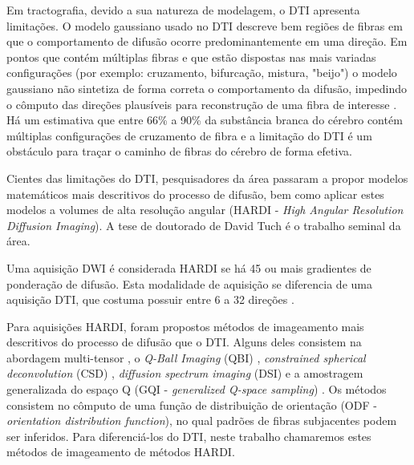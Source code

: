\documentclass[
    12pt,                %
    oneside,            %
    a4paper,            %
    english,            %
    french,                %
    spanish,            %
    brazil                %
    ]{abntex2}
\begin{document}

Em tractografia, devido a sua natureza de modelagem, o DTI apresenta limitações. O modelo gaussiano usado no DTI descreve bem regiões de fibras em que o comportamento de difusão ocorre predominantemente em uma direção. Em pontos que contém múltiplas fibras e que estão dispostas nas mais variadas configurações (por exemplo: cruzamento, bifurcação, mistura, "beijo") o modelo gaussiano não sintetiza de forma correta o comportamento da difusão, impedindo o cômputo das direções plausíveis para reconstrução de uma fibra de interesse \cite{fillard2011, daducci2014}. Há um estimativa que entre 66\% a 90\% da substância branca do cérebro contém múltiplas configurações de cruzamento de fibra \cite{descoteaux2015} e a limitação do DTI é um obstáculo para traçar o caminho de fibras do cérebro de forma efetiva.



Cientes das limitações do DTI, pesquisadores da área passaram a propor modelos matemáticos mais descritivos do processo de difusão, bem como aplicar estes modelos a volumes de alta resolução angular  (HARDI - \textit{High Angular Resolution Diffusion Imaging}). A tese de doutorado de David Tuch \cite{tuch2002} é o trabalho seminal da área.

Uma aquisição DWI é considerada HARDI se há 45 ou mais gradientes de ponderação de difusão. Esta modalidade de aquisição se diferencia de uma aquisição DTI, que costuma possuir entre 6 a 32 direções \cite{descoteaux2015}.


Para aquisições HARDI, foram propostos métodos de imageamento mais descritivos do processo de difusão que o DTI. Alguns deles consistem na abordagem multi-tensor \cite{tuch2002}, o \textit{Q-Ball Imaging} (QBI) \cite{tuch2002, Kindlmann2004}, \textit{constrained spherical deconvolution} (CSD) \cite{tournier2007}, \textit{diffusion spectrum imaging} (DSI) \cite{tuch2002,wedeen2005} e a amostragem generalizada do espaço Q (GQI - \textit{generalized Q-space sampling}) \cite{yeh2010}. Os métodos consistem no cômputo de uma função de distribuição de orientação (ODF - \textit{orientation distribution function}), no qual padrões de fibras subjacentes podem ser inferidos. Para diferenciá-los do DTI, neste trabalho chamaremos estes métodos de imageamento de métodos HARDI.
\end{document}
